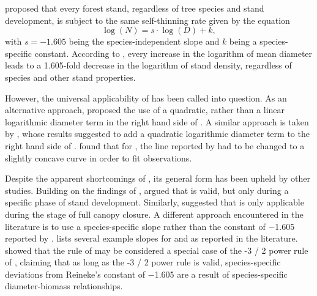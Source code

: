 \textcite{Reineke1933} proposed that every forest stand, regardless of tree species and stand development, is subject to the same self-thinning rate given by the equation
\begin{equation}
  \label{eq:Reineke}
  \log (N) = s \cdot \log (D) + k ,
\end{equation}
with \(s = -1.605\) being the species-independent slope and \(k\) being a species-specific constant.  According to \textcite{Reineke1933}, every increase in the logarithm of mean diameter leads to a \num{1.605}-fold decrease in the logarithm of stand density, regardless of species and other stand properties.

However, the universal applicability of  has been called into question.  As an alternative approach, \textcite{Charru2012} proposed the use of a quadratic, rather than a linear logarithmic diameter term in the right hand side of . A similar approach is taken by \textcite{Schuetz2008,Schuetz2010,Zeide1995}, whose results suggested to add a quadratic logarithmic diameter term to the right hand side of .  \textcite{Meyer1938} found that for \Ponderosa{}, the line reported by \textcite{Reineke1933} had to be changed to a slightly concave curve in order to fit observations.  

Despite the apparent shortcomings of , its general form has been upheld by other studies.  Building on the findings of \textcite{Drew1979}, \textcite{VanderSchaaf2010,VanderSchaaf2008} argued that  is valid, but only during a specific phase of stand development.  Similarly, \textcite{Zeide1985} suggested that  is only applicable during the stage of full canopy closure.  A different approach encountered in the literature is to use a species-specific slope rather than the constant of \num{-1.605} reported by \textcite{Reineke1933} \parencite{MacKinney1935,Pretzsch2005,Charru2012,Pretzsch2006,Río2001,Sterba1987,Vacchiano2013,Vospernik2015,Zeide1985,Zeide1987,VanderSchaaf2007}.   lists several example slopes for \Beech{} and \Spruce{} as reported in the literature.  \textcite{Pretzsch2000,Pretzsch2002} showed that the rule of \textcite{Reineke1933} may be considered a special case of the \num{-3 / 2} power rule of \textcite{Yoda1963}, claiming that as long as the \num{-3 / 2} power rule is valid, species-specific deviations from Reineke’s constant of \num{-1.605} are a result of species-specific diameter-biomass relationships.

